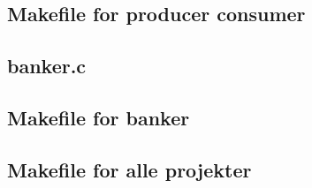 \subsection{Makefile for producer consumer}


\subsection{banker.c}


\subsection{Makefile for banker}


\subsection{Makefile for alle projekter}
